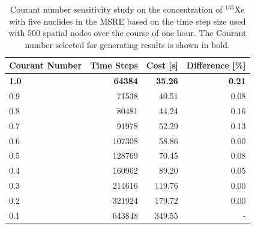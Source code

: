 \documentclass{style/nseJournal}
\begin{document}
\begin{table}[!ht]
    \centering
    \caption{Courant number sensitivity study on the concentration of $^{135}$Xe with five nuclides in the MSRE based on the time step size used with 500 spatial nodes over the course of one hour. The Courant number selected for generating results is shown in bold.}
    \begin{tabular}{l r r r}
    \hline
Courant Number & Time Steps & Cost [s] & Difference [\%] \\
\hline
\textbf{1.0} & \textbf{64384} & \textbf{35.26} & \textbf{0.21} \\
0.9 & 71538 & 40.51 & 0.08 \\
0.8 & 80481 & 44.24 & 0.16 \\
0.7 & 91978 & 52.29 & 0.13 \\
0.6 & 107308 & 58.86 & 0.00 \\
0.5 & 128769 & 70.45 & 0.08 \\
0.4 & 160962 & 89.20 & 0.05 \\
0.3 & 214616 & 119.76 & 0.00 \\
0.2 & 321924 & 179.72 & 0.00 \\
0.1 & 643848 & 349.55 & - \\
\hline
    \end{tabular}
    \label{tab:couranthour}
\end{table}

\end{document}
